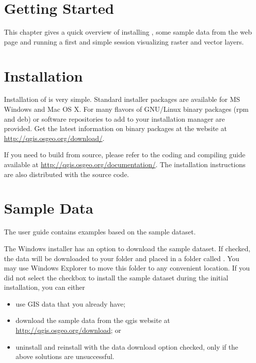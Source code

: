 
\section{Getting Started}\label{label_getstarted}


This chapter gives a quick overview of installing \qg, some sample 
data from the \qg web page and running a first and simple session 
visualizing raster and vector layers.

\section{Installation}\label{label_installation}

Installation of \qg is very simple. Standard installer packages are
available for MS Windows and Mac OS X. For many flavors of GNU/Linux binary
packages (rpm and deb) or software repositories to add to your installation
manager are provided. Get the latest information on binary packages at the
\qg website at \url{http://qgis.osgeo.org/download/}.


If you need to build \qg from source, please refer to the coding and
compiling guide available at \url{http://qgis.osgeo.org/documentation/}. 
The installation instructions are also distributed with the \qg source
code.

\section{Sample Data}\label{label_sampledata}

The user guide contains examples based on the \qg sample dataset. 

\win The Windows installer has an option to download the \qg sample dataset.
If checked, the data will be downloaded to your 
folder and placed in a folder called . 
You may use Windows Explorer to move this folder to any convenient location.
If you did not select the checkbox to install the sample dataset
during the initial \qg installation, you can either
\begin{itemize}[label=--]
\item use GIS data that you already have;
\item download the sample data from the qgis website at \url{http://qgis.osgeo.org/download}; or
\item uninstall \qg and reinstall with the data download option checked, only if 
the above solutions are unsuccessful.
\end{itemize}

